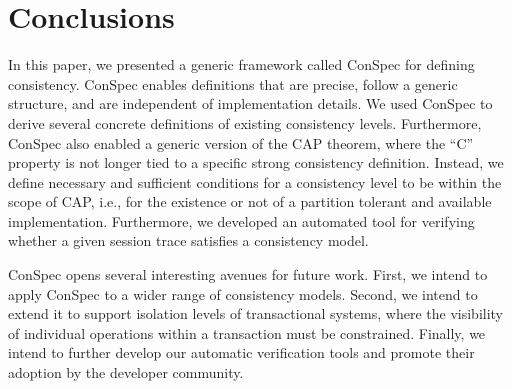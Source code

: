 \documentclass[acmlarge, ,11pt]{acmart}
\begin{document}

\section{Conclusions}
In this paper, we presented a generic framework called ConSpec for defining consistency. ConSpec enables definitions that are precise, follow a generic structure, and are independent of implementation details. We used ConSpec to derive several concrete definitions of existing consistency levels. Furthermore, ConSpec also enabled a generic version of the CAP theorem, where the ``C'' property is not longer tied to a specific strong consistency definition. Instead, we define necessary and sufficient conditions for a consistency level to be within the scope of CAP, i.e., for the existence or not of a partition tolerant and available implementation.
Furthermore, we developed an automated tool for verifying whether a given session trace satisfies a consistency model.

ConSpec opens several interesting avenues for future work. First, we intend to apply ConSpec to a wider range of consistency models. Second, we intend to extend it to support isolation levels of transactional systems, where the visibility of individual operations within a transaction must be constrained. Finally, we intend to further develop our automatic verification tools and promote their adoption by the developer community.


\end{document}
